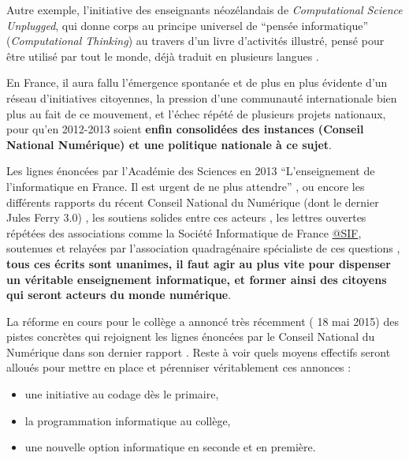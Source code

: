 Autre exemple, l'initiative des enseignants néozélandais de \textit{Computational Science Unplugged}, qui donne corps au principe universel de \enquote{pensée informatique} (\textit{Computational Thinking}) au travers d'un livre d'activités illustré, pensé pour être utilisé par tout le monde, déjà traduit en plusieurs langues .

En France, il aura fallu l'émergence spontanée et de plus en plus évidente d'un réseau d'initiatives citoyennes, la pression d'une communauté internationale bien plus au fait de ce mouvement, et l'échec répété de plusieurs projets nationaux, pour qu'en 2012-2013 soient \textbf{ enfin consolidées des instances (Conseil National Numérique) et une politique nationale à ce sujet}.

Les lignes énoncées par l'Académie des Sciences en 2013 \enquote{L’enseignement de l’informatique en France. Il est urgent de ne plus attendre} \autocite{AScience2013}, ou encore les différents rapports du récent Conseil National du Numérique (dont le dernier Jules Ferry 3.0) \autocite{CNNum2014}, les soutiens solides entre ces acteurs , les lettres ouvertes répétées des associations comme la Société Informatique de France \href{http://www.societe-informatique-de-france.fr/lettre-ouverte-a-monsieur-francois-hollande-president-de-la-republique-concernant-lenseignement-de-linformatique/lettre-ouverte-a-monsieur-francois-hollande-president-de-la-republique-concernant-lenseignement-de-linformatique-2/}{@SIF}, soutenues et relayées par l'association quadragénaire spécialiste de ces questions \textcite{EPI2014}, \textbf{tous ces écrits sont unanimes, il faut agir au plus vite pour dispenser un véritable enseignement informatique, et former ainsi des citoyens qui seront acteurs du monde numérique}.

La réforme en cours pour le collège a annoncé très récemment (\autocite{SIF2015} 18 mai 2015) des pistes concrètes qui rejoignent les lignes énoncées  par le Conseil National du Numérique dans son dernier rapport \autocite{CNNum2014}. Reste à voir quels moyens effectifs seront alloués pour mettre en place et pérenniser véritablement ces annonces :
\begin{itemize}[label=\textbullet]
\item une initiative au codage dès le primaire,
\item la programmation informatique au collège,
\item une nouvelle option informatique en seconde et en première.
\end{itemize}

